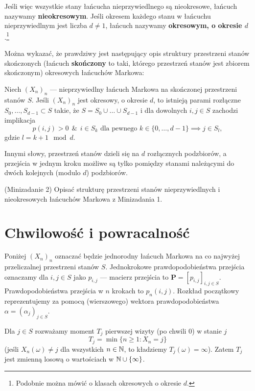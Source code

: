 \documentclass[dvipsnames]{book}
\begin{document}
Jeśli więc wszystkie stany łańcucha nieprzywiedlnego są nieokresowe, łańcuch
nazywamy \textbf{nieokresowym}. Jeśli okresem każdego stanu w łańcuchu
nieprzywiedlnym jest liczba $d \neq 1$, łańcuch nazywamy \textbf{okresowym,
o okresie $d$}.\footnote{Podobnie można mówić o klasach okresowych o okresie
$d$.}

Można wykazać, że prawdziwy jest następujący opis struktury przestrzeni stanów
skończonych (łańcuch \textbf{skończony} to taki, którego przestrzeń stanów jest
zbiorem skończonym) okresowych łańcuchów Markowa:

\begin{stwierdzenie}
Niech $(X_n)_n$ --- nieprzywiedlny łańcuch Markowa na skończonej przestrzeni
stanów $S$. Jeśli $(X_n)_n$ jest okresowy, o okresie $d$, to istnieją parami
rozłączne $S_0, \ldots, S_{d-1} \subset S$ takie, że
$S = S_0 \cup \ldots \cup S_{d-1}$ i dla dowolnych $i,j \in S$ zachodzi
implikacja
\[
  p(i,j) > 0 \ \ \&\ \ i \in S_k \text{ dla pewnego } k \in \{0,\ldots,d-1\}
  \implies j \in S_l,
\]
gdzie $l = k+1 \mod d$.
\end{stwierdzenie}

Innymi słowy, przestrzeń stanów dzieli się na $d$ rozłącznych podzbiorów,
a przejścia w jednym kroku możliwe są tylko pomiędzy stanami należącymi do
dwóch kolejnych (modulo $d$) podzbiorów.

\begin{zadanie}{(Minizadanie 2)}
Opisać strukturę przestrzeni stanów nieprzywiedlnych i nieokresowych łańcuchów
Markowa z Minizadania 1.
\end{zadanie}

\section*{Chwilowość i powracalność}

Poniżej $(X_n)_n$ oznaczać będzie jednorodny łańcuch Markowa na co najwyżej
przeliczalnej przestrzeni stanów $S$. Jednokrokowe prawdopodobieństwa przejścia
oznaczamy dla $i,j \in S$ jako $p_{i,j}$ --- macierz przejścia to
$\mathbf{P} = [p_{i,j}]_{i,j \in S}$. Prawdopodobieństwa przejścia w $n$
krokach to $p_n(i,j)$. Rozkład początkowy reprezentujemy za pomocą
(wierszowego) wektora prawdopodobieństwa $\alpha = (\alpha_j)_{j \in S}$.

Dla $j \in S$ rozważamy moment $T_j$ pierwszej wizyty (po chwili $0$)
w stanie $j$
\[
  T_j = \min\{n \geq 1 : X_n = j\}
\]
(jeśli $X_n(\omega) \neq j$ dla wszystkich $n \in \mathbb{N}$, to kładziemy
$T_j(\omega) = \infty$). Zatem $T_j$ jest zmienną losową o wartościach
w $\mathbb{N} \cup \{\infty\}$.
\end{document}
